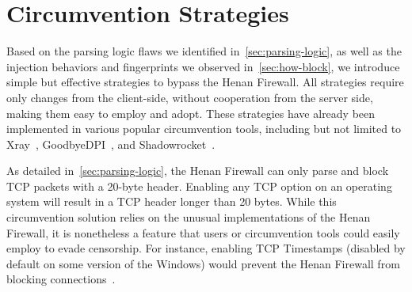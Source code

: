 \documentclass[conference,compsoc]{IEEEtran}
\begin{document}
\section{Circumvention Strategies}
\label{sec:circumvention}

Based on the parsing logic flaws we identified in~\autoref{sec:parsing-logic},
as well as the injection behaviors and fingerprints we observed in~\autoref{sec:how-block},
we introduce simple but effective strategies to bypass the Henan Firewall.
All strategies require only changes from the client-side,
without cooperation from the server side,
making them easy to employ and adopt.
These strategies have already been implemented in various popular circumvention tools,
including but not limited to
Xray~\cite{Xray},
GoodbyeDPI~\cite{GoodbyeDPI},
and Shadowrocket~\cite{shadowrocket}.

As detailed in~\autoref{sec:parsing-logic},
the Henan Firewall can only parse and block TCP packets with a 20-byte header.
Enabling any TCP option on an operating system will result in
a TCP header longer than 20 bytes.
While this circumvention solution relies on the unusual implementations of the Henan Firewall,
it is nonetheless a feature that users or circumvention tools could easily employ to evade censorship.
For instance,
enabling TCP Timestamps (disabled by default on some version of the Windows) would
prevent the Henan Firewall from blocking connections~\cite{tsinbei_tcp_timestamps,net4people442}.

\end{document}
